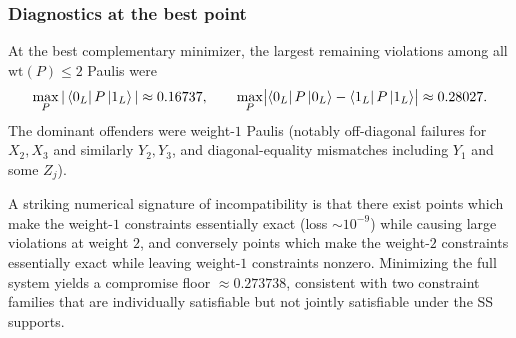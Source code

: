 \documentclass[11pt]{article}
\begin{document}
\subsubsection{Diagnostics at the best point}
At the best complementary minimizer, the largest remaining violations among all \(\mathrm{wt}(P)\le 2\) Paulis were
\[
\max_{P}|\bra{0_L}P\ket{1_L}|\approx 0.16737,
\qquad
\max_{P}\bigl|\bra{0_L}P\ket{0_L}-\bra{1_L}P\ket{1_L}\bigr|\approx 0.28027.
\]
The dominant offenders were weight-\(1\) Paulis (notably off-diagonal failures for \(X_2,X_3\) and similarly \(Y_2,Y_3\), and
diagonal-equality mismatches including \(Y_1\) and some \(Z_j\)).

A striking numerical signature of incompatibility is that there exist points which make the weight-\(1\) constraints essentially exact
(loss \(\sim 10^{-9}\)) while causing large violations at weight \(2\), and conversely points which make the weight-\(2\) constraints
essentially exact while leaving weight-\(1\) constraints nonzero. Minimizing the full system yields a compromise floor
\(\approx 0.273738\), consistent with two constraint families that are individually satisfiable but not jointly satisfiable under the SS supports.
\end{document}

